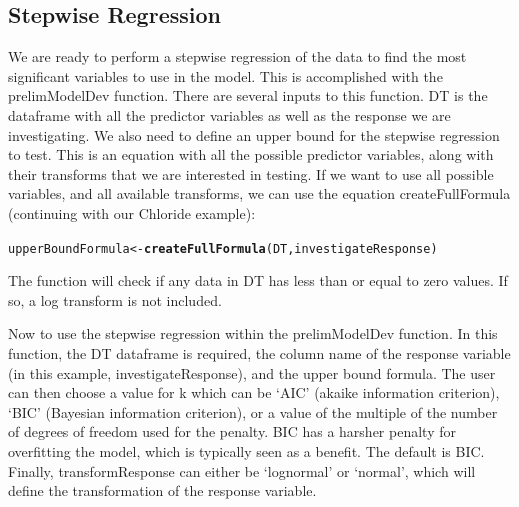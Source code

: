 \documentclass[a4paper,11pt]{article}\usepackage[]{graphicx}\usepackage[]{color}
\makeatletter
\newcommand{\hlkwd}[1]{\textcolor[rgb]{0.737,0.353,0.396}{\textbf{#1}}}%
\newenvironment{kframe}{%
 \def\at@end@of@kframe{}%
 \ifinner\ifhmode%
  \def\at@end@of@kframe{\end{minipage}}%
  \begin{minipage}{\columnwidth}%
 \fi\fi%
 \def\FrameCommand##1{\hskip\@totalleftmargin \hskip-\fboxsep
 \colorbox{shadecolor}{##1}\hskip-\fboxsep
     \hskip-\linewidth \hskip-\@totalleftmargin \hskip\columnwidth}%
 \MakeFramed {\advance\hsize-\width
   \@totalleftmargin\z@ \linewidth\hsize
   \@setminipage}}%
 {\par\unskip\endMakeFramed%
 \at@end@of@kframe}
\newenvironment{knitrout}{}{} %
\makeatother
\begin{document}
\FloatBarrier
\subsection{Stepwise Regression}
We are ready to perform a stepwise regression of the data to find the most significant variables to use in the model. This is accomplished with the prelimModelDev function. There are several inputs to this function. DT is the dataframe with all the predictor variables as well as the response we are investigating. We also need to define an upper bound for the stepwise regression to test. This is an equation with all the possible predictor variables, along with their transforms that we are interested in testing. If we want to use all possible variables, and all available transforms, we can use the equation createFullFormula (continuing with our Chloride example):

\begin{knitrout}
\color{fgcolor}\begin{kframe}
\begin{alltt}
upperBoundFormula <- \hlkwd{createFullFormula}(DT,investigateResponse)
\end{alltt}


{\ttfamily\noindent\bfseries\color{errorcolor}{Error: object 'DT' not found}}\end{kframe}
\end{knitrout}


\begin{knitrout}
\color{fgcolor}\begin{kframe}


{\ttfamily\noindent\bfseries\color{errorcolor}{Error: object 'upperBoundFormula' not found}}

{\ttfamily\noindent\bfseries\color{errorcolor}{Error: object 'upperBoundFormula' not found}}\end{kframe}
\end{knitrout}


The function will check if any data in DT has less than or equal to zero values. If so, a log transform is not included.

Now to use the stepwise regression within the prelimModelDev function. In this function, the DT dataframe is required, the column name of the response variable (in this example, investigateResponse), and the upper bound formula. The user can then choose a value for k which can be `AIC' (akaike information criterion), `BIC' (Bayesian information criterion), or a value of the multiple of the number of degrees of freedom used for the penalty. BIC has a harsher penalty for overfitting the model, which is typically seen as a benefit. The default is BIC. Finally, transformResponse can either be `lognormal' or `normal', which will define the transformation of the response variable. 
\end{document}
